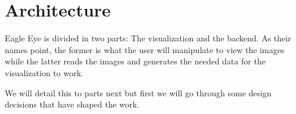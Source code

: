 \section{Architecture} %
\label{sec:architecture}

Eagle Eye is divided in two parts: The visualization and the backend. As their names point, the former is what the user will manipulate to view the images while the latter reads the images and generates the needed data for the visualization to work.

We will detail this to parts next but first we will go through some design decisions that have shaped the work. 


